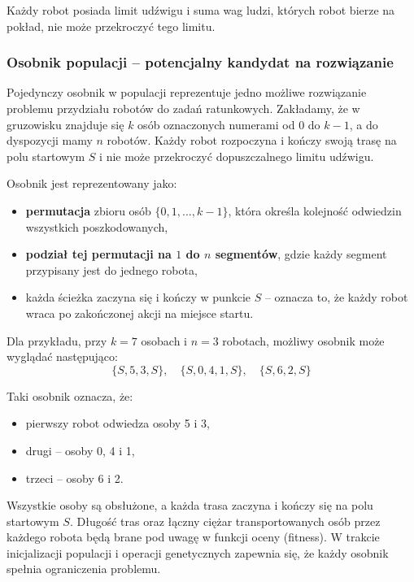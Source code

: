 \documentclass[12pt]{article}
\begin{document}
Każdy robot posiada limit udźwigu i suma wag ludzi, których robot bierze na pokład, nie może przekroczyć tego limitu.

\subsubsection{Osobnik populacji – potencjalny kandydat na rozwiązanie}

Pojedynczy osobnik w populacji reprezentuje jedno możliwe rozwiązanie problemu przydziału robotów do zadań ratunkowych. Zakładamy, że w gruzowisku znajduje się \( k \) osób oznaczonych numerami od \( 0 \) do \( k-1 \), a do dyspozycji mamy \( n \) robotów. Każdy robot rozpoczyna i kończy swoją trasę na polu startowym \( S \) i nie może przekroczyć dopuszczalnego limitu udźwigu.

\vspace{2mm}

Osobnik jest reprezentowany jako:
\begin{itemize}
    \item \textbf{permutacja} zbioru osób \(\{0, 1, \dots, k-1\}\), która określa kolejność odwiedzin wszystkich poszkodowanych,
    \item \textbf{podział tej permutacji na \( 1 \) do \( n \) segmentów}, gdzie każdy segment przypisany jest do jednego robota,
    \item każda ścieżka zaczyna się i kończy w punkcie \( S \) – oznacza to, że każdy robot wraca po zakończonej akcji na miejsce startu.
\end{itemize}

Dla przykładu, przy \( k = 7 \) osobach i \( n = 3 \) robotach, możliwy osobnik może wyglądać następująco:
\[
\{S, 5, 3, S\}, \quad \{S, 0, 4, 1, S\}, \quad \{S, 6, 2, S\}
\]

Taki osobnik oznacza, że:
\begin{itemize}
    \item pierwszy robot odwiedza osoby 5 i 3,
    \item drugi – osoby 0, 4 i 1,
    \item trzeci – osoby 6 i 2.
\end{itemize}

Wszystkie osoby są obsłużone, a każda trasa zaczyna i kończy się na polu startowym \( S \). Długość tras oraz łączny ciężar transportowanych osób przez każdego robota będą brane pod uwagę w funkcji oceny (fitness). W trakcie inicjalizacji populacji i operacji genetycznych zapewnia się, że każdy osobnik spełnia ograniczenia problemu.
\end{document}
